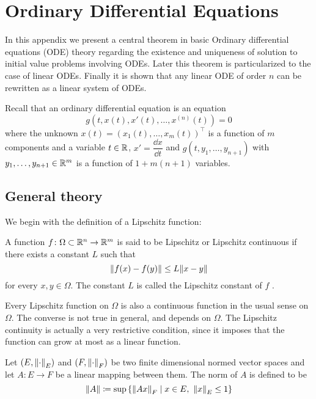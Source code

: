 
\section{Ordinary Differential Equations}

In this appendix we present a central theorem in basic Ordinary differential
equations (ODE) theory regarding the existence and uniqueness of solution to
initial value problems involving ODEs. Later this theorem is particularized to
the case of linear ODEs. Finally it is shown that any linear ODE of order $n$
can be rewritten as a linear system of ODEs.

Recall that an ordinary differential equation is an equation
\begin{equation*}
	g(t, x(t), x'(t), \ldots, x^{(n)}(t)) = 0
\end{equation*}
where the unknown $x(t) = (x_1(t), \ldots, x_m(t))^\top$ is a function of $m$
components and a variable $t \in \mathbb{R}$, $x' = \dfrac{\dd{x}}{\dd{t}}$ and $g(t,
y_1, \ldots, y_{n+1})$ with $y_1, \ldots, y_{n+1} \in \mathbb{R}^m$ is a function of
$1 + m(n+1)$ variables.

\subsection{General theory}

We begin with the definition of a Lipschitz function:

\begin{definition*}
	A function $f \colon \Omega \subset \mathbb{R}^n \rightarrow \mathbb{R}^m$ is said to
	be Lipschitz or Lipschitz continuous if there exists a constant $L$ such
	that
	\begin{equation*}
		\norm{f(x) - f(y)} \leq L \norm{x - y}
	\end{equation*}
	for every $x, y \in \Omega$. The constant $L$ is called the
	Lipschitz constant of $f$ \cite{salsa2009pde}.
\end{definition*}

Every Lipschitz function on $\Omega$ is also a continuous function in the usual
sense on $\Omega$. The converse is not true in general, and depends on $\Omega$.
The Lipschitz continuity is actually a very restrictive condition, since it
imposes that the function can grow at most as a linear function. 

\begin{definition*}
	Let $(E, \norm{\cdot}_E)$ and $(F, \norm{\cdot}_F)$ be two finite
	dimensional normed vector spaces and let $A \colon E \rightarrow F$ be a
	linear mapping between them. The norm of $A$ is defined to be
	\begin{equation*}
		\norm{A} \coloneqq 
		\sup{\left\{ \norm{A x}_F \mid x \in E, \ \norm{x}_E \leq 1 \right\}}
	\end{equation*}
\end{definition*}

